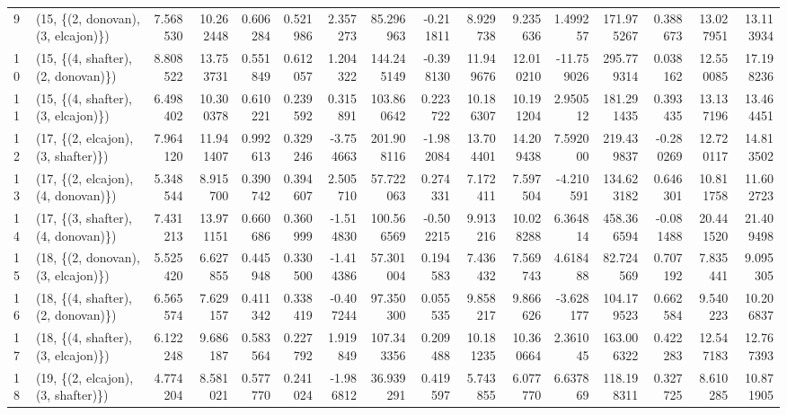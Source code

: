 \begin{tabular}{llrrrrrrrrrrrrrr}
9  &  (15, \{(2, donovan), (3, elcajon)\}) &   7.568530 &  10.262448 &   0.606284 &  0.521986 &   2.357273 &    85.296963 &  -0.211811 &   8.929738 &   9.235636 &   1.499257 &  171.975267 &  0.388673 &  13.027951 &  13.113934 \\
10 &  (15, \{(4, shafter), (2, donovan)\}) &   8.808522 &  13.753731 &   0.551849 &  0.612057 &   1.204322 &   144.245149 &  -0.398130 &  11.949676 &  12.010210 & -11.759026 &  295.779314 &  0.038162 &  12.550085 &  17.198236 \\
11 &  (15, \{(4, shafter), (3, elcajon)\}) &   6.498402 &  10.300378 &   0.610221 &  0.239592 &   0.315891 &   103.860642 &   0.223722 &  10.186307 &  10.191204 &   2.950512 &  181.291435 &  0.393435 &  13.137196 &  13.464451 \\
12 &  (17, \{(2, elcajon), (3, shafter)\}) &   7.964120 &  11.941407 &   0.992613 &  0.329246 &  -3.754663 &   201.908116 &  -1.982084 &  13.704401 &  14.209438 &   7.592000 &  219.439837 & -0.280269 &  12.720117 &  14.813502 \\
13 &  (17, \{(2, elcajon), (4, donovan)\}) &   5.348544 &   8.915700 &   0.390742 &  0.394607 &   2.505710 &    57.722063 &   0.274331 &   7.172411 &   7.597504 &  -4.210591 &  134.623182 &  0.646301 &  10.811758 &  11.602723 \\
14 &  (17, \{(3, shafter), (4, donovan)\}) &   7.431213 &  13.971151 &   0.660686 &  0.360999 &  -1.514830 &   100.566569 &  -0.502215 &   9.913216 &  10.028288 &   6.364814 &  458.366594 & -0.081488 &  20.441520 &  21.409498 \\
15 &  (18, \{(2, donovan), (3, elcajon)\}) &   5.525420 &   6.627855 &   0.445948 &  0.330500 &  -1.414386 &    57.301004 &   0.194583 &   7.436432 &   7.569743 &   4.618488 &   82.724569 &  0.707192 &   7.835441 &   9.095305 \\
16 &  (18, \{(4, shafter), (2, donovan)\}) &   6.565574 &   7.629157 &   0.411342 &  0.338419 &  -0.407244 &    97.350300 &   0.055535 &   9.858217 &   9.866626 &  -3.628177 &  104.179523 &  0.662584 &   9.540223 &  10.206837 \\
17 &  (18, \{(4, shafter), (3, elcajon)\}) &   6.122248 &   9.686187 &   0.583564 &  0.227792 &   1.919849 &   107.343356 &   0.209488 &  10.181235 &  10.360664 &   2.361045 &  163.006322 &  0.422283 &  12.547183 &  12.767393 \\
18 &  (19, \{(2, elcajon), (3, shafter)\}) &   4.774204 &   8.581021 &   0.577770 &  0.241024 &  -1.986812 &    36.939291 &   0.419597 &   5.743855 &   6.077770 &   6.637869 &  118.198311 &  0.327725 &   8.610285 &  10.871905 \\

\end{tabular}
